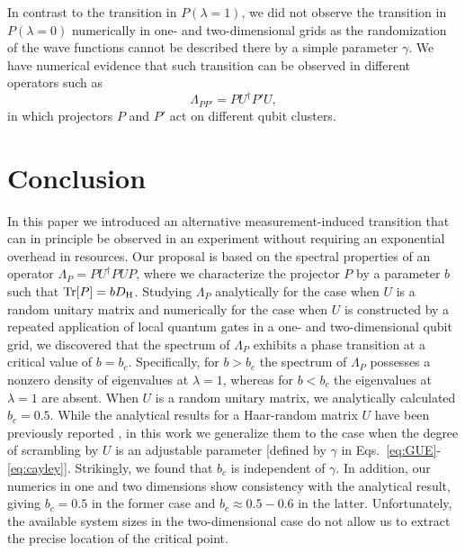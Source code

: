 \documentclass[%
 reprint,
 superscriptaddress,
 amsmath,amssymb,
prx,
]{revtex4-2}\href{\href{}{}}{}
\begin{document}
In contrast to the transition in $P(\lambda=1)$, we did not observe the transition in $P(\lambda=0)$ numerically in one- and two-dimensional grids as the randomization of the wave functions cannot be described there by a simple parameter $\gamma$.
We have numerical evidence that such transition can be observed in different operators such as 
\begin{equation}
 \Lambda_{PP'}=PU^\dagger P'U,
\end{equation}  
in which projectors $P$ and $P'$ act on different qubit clusters.





\section{\label{sec:Conclusion}Conclusion}

In this paper we introduced an alternative measurement-induced transition that can in principle be observed in an experiment without requiring an exponential overhead in resources.
Our proposal is based on the spectral properties of an operator $\Lambda_P=PU^{\dag}PUP$, where we characterize the projector $P$ by a parameter $b$ such that $\Tr[P]=bD_{\rm H}$.
Studying $\Lambda_P$ analytically for the case when $U$ is a random unitary matrix and numerically for the case when $U$ is constructed by a repeated application of local quantum gates in a one- and two-dimensional qubit grid, we discovered that the spectrum of $\Lambda_P$ exhibits a phase transition at a critical value of $b=b_c$.
Specifically, for $b>b_c$ the spectrum of $\Lambda_P$ possesses a nonzero density of eigenvalues at $\lambda=1$, whereas for $b<b_c$ the eigenvalues at $\lambda=1$ are absent.
When $U$ is a random unitary matrix, we analytically calculated $b_c=0.5$.
While the analytical results for a Haar-random matrix $U$ have been previously reported \cite{Collins2005}, in this work we generalize them to the case when the degree of scrambling by $U$ is an adjustable parameter [defined by $\gamma$ in Eqs.~\eqref{eq:GUE}-\eqref{eq:cayley}].
Strikingly, we found that $b_c$ is independent of $\gamma$.
In addition, our numerics in one and two dimensions show consistency with the analytical result, giving $b_c=0.5$ in the former case and $b_c\approx 0.5-0.6$ in the latter.
Unfortunately, the available system sizes in the two-dimensional case do not allow us to extract the precise location of the critical point.
\end{document}
